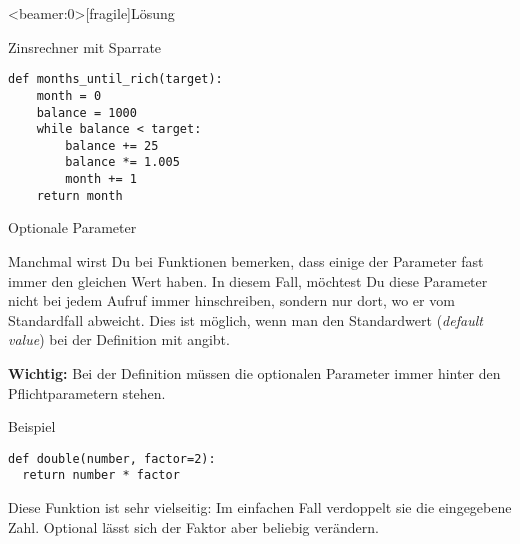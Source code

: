 \begin{frame}<beamer:0>[fragile]{Lösung}

\begin{solutionblock}{Zinsrechner mit Sparrate}
\begin{verbatim}
def months_until_rich(target):
    month = 0
    balance = 1000
    while balance < target:
        balance += 25
        balance *= 1.005
        month += 1
    return month
\end{verbatim}
\end{solutionblock}
\end{frame}



\begin{fragile}

\begin{block}{Optionale Parameter}
	
	\pause 
	
\vspace{2pt}
Manchmal wirst Du bei Funktionen bemerken, dass einige der Parameter fast immer den gleichen Wert haben. In diesem Fall, möchtest Du diese Parameter nicht bei jedem Aufruf immer hinschreiben, sondern nur dort, wo er vom Standardfall abweicht. Dies ist möglich, wenn man den Standardwert (\emph{default value}) bei der Definition mit angibt. 

\pause 

\textbf{Wichtig:} Bei der Definition müssen die optionalen Parameter immer hinter den Pflichtparametern stehen.
\end{block}

\vspace{12pt}
\pause 

\begin{exampleblock}{Beispiel}
\begin{verbatim}
def double(number, factor=2): 
  return number * factor
\end{verbatim} 


\pause 

Diese Funktion ist sehr vielseitig: Im einfachen Fall verdoppelt sie die eingegebene Zahl. Optional lässt sich der Faktor aber beliebig verändern. 
\end{exampleblock}

\end{fragile}


